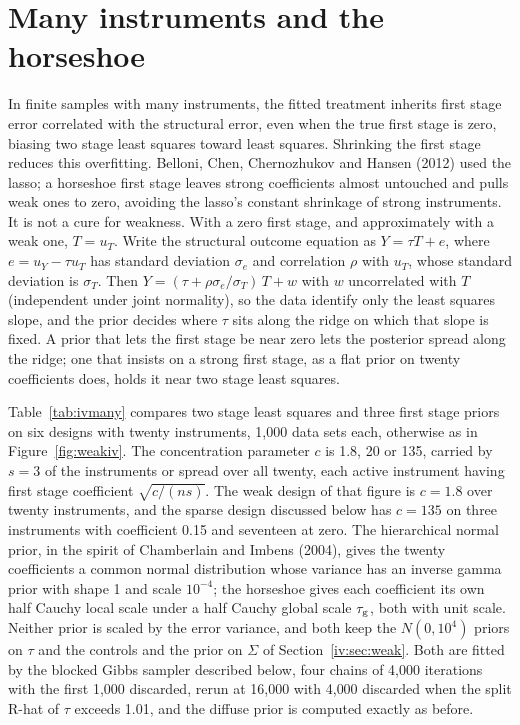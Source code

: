 \section{Many instruments and the horseshoe}\label{iv:sec:many}

In finite samples with many instruments, the fitted treatment inherits first stage error correlated with the structural error, even when the true first stage is zero, biasing two stage least squares toward least squares. Shrinking the first stage reduces this overfitting. Belloni, Chen, Chernozhukov and Hansen (2012) used the lasso; a horseshoe first stage leaves strong coefficients almost untouched and pulls weak ones to zero, avoiding the lasso's constant shrinkage of strong instruments. It is not a cure for weakness. With a zero first stage, and approximately with a weak one, $T = u_T$. Write the structural outcome equation as $Y = \tau T + e$, where $e = u_Y - \tau u_T$ has standard deviation $\sigma_e$ and correlation $\rho$ with $u_T$, whose standard deviation is $\sigma_T$. Then $Y = (\tau + \rho\sigma_e/\sigma_T)\,T + w$ with $w$ uncorrelated with $T$ (independent under joint normality), so the data identify only the least squares slope, and the prior decides where $\tau$ sits along the ridge on which that slope is fixed. A prior that lets the first stage be near zero lets the posterior spread along the ridge; one that insists on a strong first stage, as a flat prior on twenty coefficients does, holds it near two stage least squares.

Table~\ref{tab:ivmany} compares two stage least squares and three first stage priors on six designs with twenty instruments, 1,000 data sets each, otherwise as in Figure~\ref{fig:weakiv}. The concentration parameter $c$ is 1.8, 20 or 135, carried by $s = 3$ of the instruments or spread over all twenty, each active instrument having first stage coefficient $\sqrt{c/(ns)}$. The weak design of that figure is $c = 1.8$ over twenty instruments, and the sparse design discussed below has $c = 135$ on three instruments with coefficient 0.15 and seventeen at zero. The hierarchical normal prior, in the spirit of Chamberlain and Imbens (2004), gives the twenty coefficients a common normal distribution whose variance has an inverse gamma prior with shape 1 and scale $10^{-4}$; the horseshoe gives each coefficient its own half Cauchy local scale under a half Cauchy global scale $\tau_{\mathrm{g}}$, both with unit scale. Neither prior is scaled by the error variance, and both keep the $N(0, 10^4)$ priors on $\tau$ and the controls and the prior on $\Sigma$ of Section~\ref{iv:sec:weak}. Both are fitted by the blocked Gibbs sampler described below, four chains of 4{,}000 iterations with the first 1{,}000 discarded, rerun at 16{,}000 with 4{,}000 discarded when the split R-hat of $\tau$ exceeds 1.01, and the diffuse prior is computed exactly as before.

